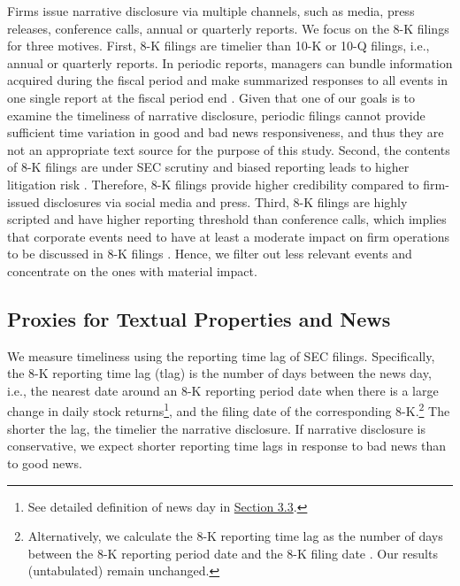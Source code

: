 \documentclass[letterpaper,12pt]{article}
\begin{document}
\begin{spacing}{1.5}
Firms issue narrative disclosure via multiple channels, such as media, press releases, conference calls, annual or quarterly reports. We focus on the 8-K filings for three motives. First, 8-K filings are timelier than 10-K or 10-Q filings, i.e., annual or quarterly reports. In periodic reports, managers can bundle information acquired during the fiscal period and make summarized responses to all events in one single report at the fiscal period end \cite{segalAreManagersStrategic2016}. Given that one of our goals is to examine the timeliness of narrative disclosure, periodic filings cannot provide sufficient time variation in good and bad news responsiveness, and thus they are not an appropriate text source for the purpose of this study. Second, the contents of 8-K filings are under SEC scrutiny and biased reporting leads to higher litigation risk \cite{rogersDisclosureToneShareholder2011}. Therefore, 8-K filings provide higher credibility compared to firm-issued disclosures via social media and press. Third, 8-K filings are highly scripted and have higher reporting threshold than conference calls, which implies that corporate events need to have at least a moderate impact on firm operations to be discussed in 8-K filings \cite{hassanFirmLevelPoliticalRisk2019}. Hence, we filter out less relevant events and concentrate on the ones with material impact. 

\subsection{Proxies for Textual Properties and News} \label{sec3.2}
\noindent We measure timeliness using the reporting time lag of SEC filings. Specifically, the 8-K reporting time lag (tlag) is the number of days between the news day, i.e., the nearest date around an 8-K reporting period date when there is a large change in daily stock returns\footnote{See detailed definition of news day in \hyperref[sec3.3]{Section 3.3}.}, and the filing date of the corresponding 8-K.\footnote{Alternatively, we calculate the 8-K reporting time lag as the number of days between the 8-K reporting period date and the 8-K filing date \cite{carterRelevanceForm8K1999, niessnerStrategicDisclosureTiming2015, chapmanInformationOverloadDisclosure2019}. Our results (untabulated) remain unchanged.} The shorter the lag, the timelier the narrative disclosure. If narrative disclosure is conservative, we expect shorter reporting time lags in response to bad news than to good news.


\end{spacing}
\end{document}
